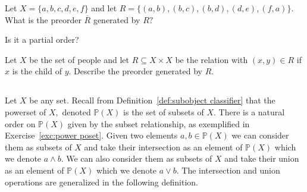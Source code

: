 \documentclass[../main/CT4S-EN-RU]{subfiles}
\begin{document}
\begin{exampleRUS}\label{ex:preorder generated}
\end{exampleRUS}

\begin{exerciseENG}
Let $X=\{a,b,c,d,e,f\}$ and let $R=\{(a,b),(b,c),(b,d),(d,e),(f,a)\}.$ 
\sexc What is the preorder $\overline{R}$ generated by $R?$
\item Is it a partial order?
\endsexc
\end{exerciseENG}

\begin{exerciseRUS}
\end{exerciseRUS}

\begin{exerciseENG}
Let $X$ be the set of people and let $R\subseteq X\times X$ be the relation with $(x,y)\in R$ if $x$ is the child of $y.$ Describe the preorder generated by $R.$
\end{exerciseENG}

\begin{exerciseRUS}
\end{exerciseRUS}


\subsection{}\label{sec:meets and joins}

\begin{blockENG}
Let $X$ be any set. Recall from Definition~\ref{def:subobject classifier} that the powerset of $X,$ denoted ${ℙ}(X)$ is the set of subsets of $X.$ There is a natural order on ${ℙ}(X)$ given by the subset relationship, as exemplified in Exercise~\ref{exc:power poset}. Given two elements $a,b\in{ℙ}(X)$ we can consider them as subsets of $X$ and take their intersection as an element of ${ℙ}(X)$ which we denote $a\wedge b.$ We can also consider them as subsets of $X$ and take their union as an element of ${ℙ}(X)$ which we denote $a\vee b.$ The intersection and union operations are generalized in the following definition.
\end{blockENG}

\begin{blockRUS}
\end{blockRUS}
\end{document}
